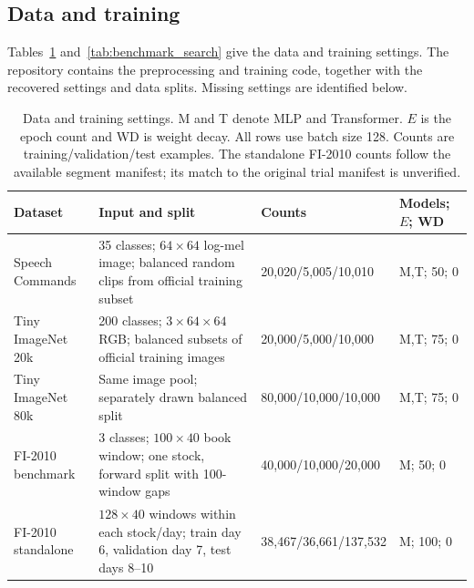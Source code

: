 \subsection{Data and training}
\label{app:benchmark_methods}
\label{app:benchmark_protocols}
Tables~\ref{tab:benchmark_protocols} and~\ref{tab:benchmark_search} give the data and training settings. The repository contains the preprocessing and training code, together with the recovered settings and data splits. Missing settings are identified below.

\begin{table}[ht]
\centering
\caption{Data and training settings. M and T denote MLP and Transformer. $E$ is the epoch count and WD is weight decay. All rows use batch size 128. Counts are training/validation/test examples. The standalone FI-2010 counts follow the available segment manifest; its match to the original trial manifest is unverified.}
\label{tab:benchmark_protocols}
\small
\setlength{\tabcolsep}{4pt}
\renewcommand{\arraystretch}{1.2}
\begin{tabular}{@{}p{}p{}p{}p{}@{}}
\toprule
Dataset & Input and split & Counts & Models; $E$; WD \\
\midrule
Speech Commands & 35 classes; $64\!\times\!64$ log-mel image; balanced random clips from official training subset & 20,020/5,005/10,010 & M,T; 50; $0$ \\
Tiny ImageNet 20k & 200 classes; $3\!\times\!64\!\times\!64$ RGB; balanced subsets of official training images & 20,000/5,000/10,000 & M,T; 75; $0$ \\
Tiny ImageNet 80k & Same image pool; separately drawn balanced split & 80,000/10,000/10,000 & M,T; 75; $0$ \\
FI-2010 benchmark & 3 classes; $100\!\times\!40$ book window; one stock, forward split with 100-window gaps & 40,000/10,000/20,000 & M; 50; $0$ \\
FI-2010 standalone & $128\!\times\!40$ windows within each stock/day; train day 6, validation day 7, test days 8--10 & 38,467/36,661/137,532 & M; 100; $0$ \\
\bottomrule
\end{tabular}
\end{table}


